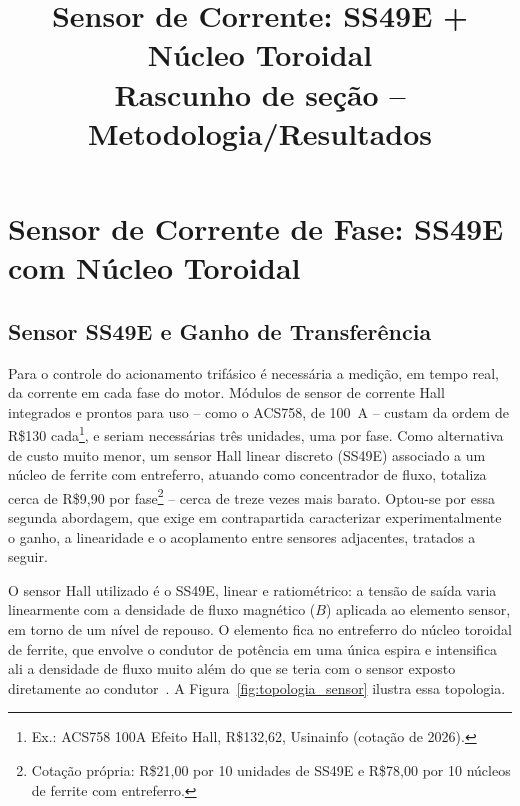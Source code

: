 \documentclass[12pt,a4paper]{article}
\title{Sensor de Corrente: SS49E + Núcleo Toroidal\\
\large Rascunho de seção -- Metodologia/Resultados}
\author{}
\date{}
\begin{document}
\maketitle

\section{Sensor de Corrente de Fase: SS49E com Núcleo Toroidal}
\label{sec:sensor_corrente_fase}

\subsection{Sensor SS49E e Ganho de Transferência}
\label{sec:ss49e}

Para o controle do acionamento trifásico é necessária a medição, em tempo
real, da corrente em cada fase do motor. Módulos de sensor de corrente Hall
integrados e prontos para uso -- como o ACS758, de \SI{100}{\ampere} --
custam da ordem de R\$130 cada\footnote{Ex.: ACS758 100A Efeito Hall,
R\$132,62, Usinainfo (cotação de 2026).}, e seriam necessárias três
unidades, uma por fase. Como alternativa de custo muito menor, um sensor
Hall linear discreto (SS49E) associado a um núcleo de ferrite com
entreferro, atuando como concentrador de fluxo, totaliza cerca de R\$9,90
por fase\footnote{Cotação própria: R\$21,00 por 10 unidades de SS49E e
R\$78,00 por 10 núcleos de ferrite com entreferro.} -- cerca de treze vezes
mais barato. Optou-se por essa segunda abordagem, que exige em
contrapartida caracterizar experimentalmente o ganho, a linearidade e o
acoplamento entre sensores adjacentes, tratados a seguir.

O sensor Hall utilizado é o SS49E, linear e ratiométrico: a tensão de saída
varia linearmente com a densidade de fluxo magnético ($B$) aplicada ao
elemento sensor, em torno de um nível de repouso. O elemento fica no
entreferro do núcleo toroidal de ferrite, que envolve o condutor de
potência em uma única espira e intensifica ali a densidade de fluxo muito
além do que se teria com o sensor exposto diretamente ao
condutor~\cite{hall_dc_sensor_2016}. A Figura~\ref{fig:topologia_sensor}
ilustra essa topologia.
\end{document}
